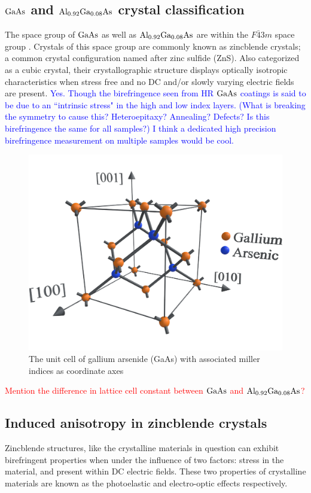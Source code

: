 \subsection{$\mathrm{GaAs}$ and $\mathrm{Al_{0.92}Ga_{0.08}As}$ crystal classification}
The space group of $\mathrm{GaAs}$ as well as $\mathrm{Al_{0.92}Ga_{0.08}As}$ are within the $F\bar{4}3m$ space group \cite{}. Crystals of this space group are commonly known as zincblende crystals; a common crystal configuration named after zinc sulfide (ZnS). Also categorized as a cubic crystal, their crystallographic structure displays optically isotropic characteristics when stress free and no DC and/or slowly varying electric fields are present.
 \textcolor{blue}{Yes. Though the birefringence seen from HR $\mathrm{GaAs}$ coatings is said to be due to an ``intrinsic stress" in the high and low index layers. (What is breaking the symmetry to cause this? Heteroepitaxy? Annealing? Defects? Is this birefringence the same for all samples?) I think a dedicated high precision birefringence measurement on multiple samples would be cool.}

\begin{figure}[H]
\begin{center}
\includegraphics[width=.85\textwidth]{figs/ALGAAS/gaas_unit_cell_mi.pdf}
\caption{The unit cell of gallium arsenide (GaAs) with associated miller indices as coordinate axes}
\end{center}
\label{fig:gaas_uc}
\end{figure}

\textcolor{red}{Mention the difference in lattice cell constant between $\mathrm{GaAs}$ and $\mathrm{Al_{0.92}Ga_{0.08}As}$?}

\subsection{Induced anisotropy in zincblende crystals}
Zincblende structures, like the crystalline materials in question can exhibit birefringent properties when under the influence of two factors: stress in the material, and present within DC electric fields. These two properties of crystalline materials are known as the photoelastic and electro-optic effects respectively.

